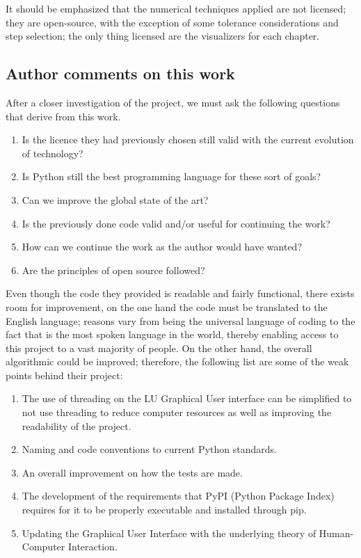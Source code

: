 It should be emphasized that the numerical techniques applied are not licensed; they are open-source, with the exception of some tolerance considerations and step selection; the only thing licensed are the visualizers for each chapter.


\subsection{Author comments on this work}
After a closer investigation of the project, we must ask the following questions that derive from this work.
\begin{enumerate}
    \item Is the licence they had previously chosen still valid with the current evolution of technology?
    \item Is Python still the best programming language for these sort of goals?
    \item Can we improve the global state of the art?
    \item Is the previously done code valid and/or useful for continuing the work?
    \item How can we continue the work as the author would have wanted?
    \item Are the principles of open source followed?
\end{enumerate}

Even though the code they provided is readable and fairly functional, there exists room for improvement, on the one hand the code must be translated to the English language; reasons vary from being the universal language of coding to the fact that is the most spoken language in the world, thereby enabling access to this project to a vast majority of people. On the other hand, the overall algorithmic could be improved; therefore, the following list are some of the weak points behind their project:

\begin{enumerate}
    \item The use of threading on the LU Graphical User interface can be simplified to not use threading to reduce computer resources as well as improving the readability of the project.
    \item Naming and code conventions to current Python standards.
    \item An overall improvement on how the tests are made.
    \item The development of the requirements that PyPI (Python Package Index) requires for it to be properly executable and installed through pip.
    \item Updating the Graphical User Interface with the underlying theory of Human-Computer Interaction.
\end{enumerate}


